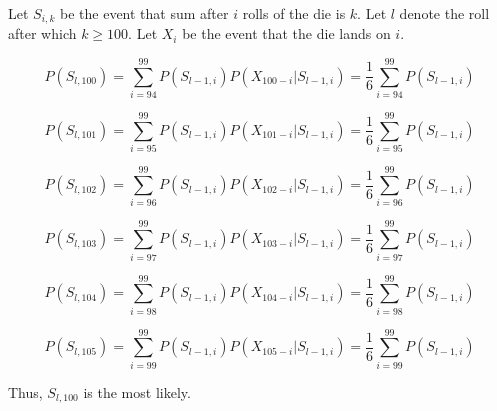 Let $S_{i, k}$ be the event that sum after $i$ rolls of the die is $k$. Let $l$
denote the roll after which $k \geq 100$. Let $X_{i}$ be the event that the die
lands on $i$.

$$P(S_{l, 100}) = \sum_{i=94}^{99}P(S_{l-1, i})P(X_{100-i}|S_{l-1, i}) = 
\frac{1}{6}\sum_{i=94}^{99}P(S_{l-1, i})$$

$$P(S_{l, 101}) = \sum_{i=95}^{99}P(S_{l-1, i})P(X_{101-i}|S_{l-1, i}) = 
\frac{1}{6}\sum_{i=95}^{99}P(S_{l-1, i})$$

$$P(S_{l, 102}) = \sum_{i=96}^{99}P(S_{l-1, i})P(X_{102-i}|S_{l-1, i}) = 
\frac{1}{6}\sum_{i=96}^{99}P(S_{l-1, i})$$

$$P(S_{l, 103}) = \sum_{i=97}^{99}P(S_{l-1, i})P(X_{103-i}|S_{l-1, i}) = 
\frac{1}{6}\sum_{i=97}^{99}P(S_{l-1, i})$$

$$P(S_{l, 104}) = \sum_{i=98}^{99}P(S_{l-1, i})P(X_{104-i}|S_{l-1, i}) = 
\frac{1}{6}\sum_{i=98}^{99}P(S_{l-1, i})$$

$$P(S_{l, 105}) = \sum_{i=99}^{99}P(S_{l-1, i})P(X_{105-i}|S_{l-1, i}) = 
\frac{1}{6}\sum_{i=99}^{99}P(S_{l-1, i})$$

Thus, $S_{l, 100}$ is the most likely.